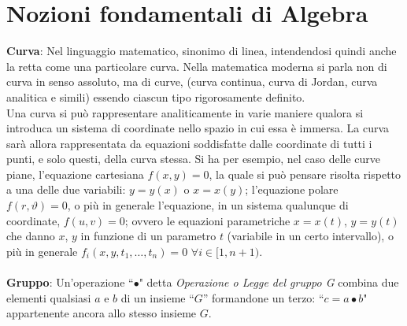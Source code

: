 \documentclass[a4paper,12pt]{tesiinfo}
\begin{document}
\chapter{Nozioni fondamentali di Algebra}
\textbf{Curva}: Nel linguaggio matematico, sinonimo di linea, intendendosi quindi anche la retta come una particolare curva. Nella matematica moderna si parla non di curva in senso assoluto, ma di curve, (curva continua, curva di Jordan, curva analitica e simili) essendo ciascun tipo rigorosamente definito. %
\\
Una curva si pu\`o rappresentare analiticamente in varie maniere qualora si introduca un sistema di coordinate nello spazio in cui essa \`e immersa. La curva sar\`a allora rappresentata da equazioni soddisfatte dalle coordinate di tutti i punti, e solo questi, della curva stessa. Si ha per esempio, nel caso delle curve piane, l'equazione cartesiana $f (x, y)=0$, la quale si pu\`o pensare risolta rispetto a una delle due variabili: $y=y (x)$ o $x=x (y)$; l'equazione polare $f (r, \vartheta)=0$, o pi\`u in generale l'equazione, in un sistema qualunque di coordinate, $f (u, v)=0$; ovvero le equazioni parametriche $x=x (t)$, $y=y (t)$ che danno $x$, $y$ in funzione di un parametro $t$ (variabile in un certo intervallo), o pi\`u in generale $f_i (x, y, t_1 , \ldots, t_n )=0$ $\forall i \in [1, n+1)$.
%
%
%
\\
\\
\textbf{Gruppo}: Un'operazione ``$\bullet$" detta \textit{Operazione o Legge del gruppo G} combina due elementi qualsiasi $a$ e $b$ di un insieme ``$G$'' formandone un terzo: ``$c = a\bullet b$" appartenente ancora allo stesso insieme $G$. 
\end{document}
